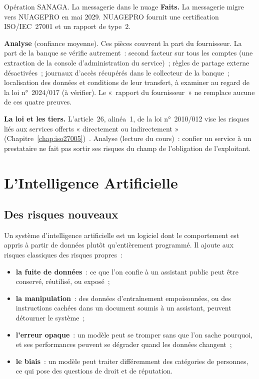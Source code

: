 \begin{boxscenario}{Opération SANAGA. La messagerie dans le nuage}
\textbf{Faits.} La messagerie migre vers NUAGEPRO en mai 2029. NUAGEPRO
fournit une certification ISO/IEC~27001 et un rapport de type~2.

\medskip
\textbf{Analyse} (confiance moyenne). Ces pièces couvrent la part du
fournisseur. La part de la banque se vérifie autrement~: second facteur sur
tous les comptes (une extraction de la console d'administration du
service)~; règles de partage externe désactivées~; journaux d'accès
récupérés dans le collecteur de la banque~; localisation des données et
conditions de leur transfert, à examiner au regard de la loi
n°~2024/017 (à vérifier). Le «~rapport du fournisseur~» ne remplace aucune de
ces quatre preuves.
\end{boxscenario}

\begin{boxinfo}
\textbf{La loi et les tiers.} L'article~26, alinéa~1, de la loi
n°~2010/012 vise les risques liés aux services offerts « directement ou
indirectement » (Chapitre~\ref{chap:iso27005})~\cite{loi2010012}.
Analyse (lecture du cours)~: confier un service à un prestataire ne fait
pas sortir ses risques du champ de l'obligation de l'exploitant.
\end{boxinfo}

\section{L'Intelligence Artificielle}
\label{sec:c15-ia}

\subsection{Des risques nouveaux}

Un système d'intelligence artificielle est un logiciel dont le comportement
est appris à partir de données plutôt qu'entièrement programmé. Il ajoute
aux risques classiques des risques propres~:
\begin{itemize}
    \item \textbf{la fuite de données}~: ce que l'on confie à un assistant
          public peut être conservé, réutilisé, ou exposé~;
    \item \textbf{la manipulation}~: des données d'entraînement empoisonnées,
          ou des instructions cachées dans un document soumis à un
          assistant, peuvent détourner le système~;
    \item \textbf{l'erreur opaque}~: un modèle peut se tromper sans que l'on
          sache pourquoi, et ses performances peuvent se dégrader quand les
          données changent~;
    \item \textbf{le biais}~: un modèle peut traiter différemment des
          catégories de personnes, ce qui pose des questions de droit et de
          réputation.
\end{itemize}

